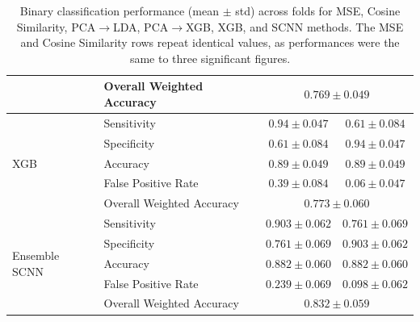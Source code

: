 \begin{table}[htbp]
\begin{tabular}{llcc}
       & Overall Weighted Accuracy & \multicolumn{2}{c}{$0.769\pm0.049$} \\
\midrule
\multirow{5}{*}{XGB} 
       & Sensitivity           & $0.94\pm0.047$      & $0.61\pm0.084$     \\
       & Specificity           & $0.61\pm0.084$      & $0.94\pm0.047$     \\
       & Accuracy              & $0.89\pm0.049$      & $0.89\pm0.049$     \\
       & False Positive Rate   & $0.39\pm0.084$      & $0.06\pm0.047$     \\
       & Overall Weighted Accuracy & \multicolumn{2}{c}{$0.773\pm0.060$} \\
\midrule
\multirow{5}{*}{Ensemble SCNN} 
       & Sensitivity           & $0.903\pm0.062$     & $0.761\pm0.069$    \\
       & Specificity           & $0.761\pm0.069$     & $0.903\pm0.062$    \\
       & Accuracy              & $0.882\pm0.060$     & $0.882\pm0.060$    \\
       & False Positive Rate   & $0.239\pm0.069$     & $0.098\pm0.062$    \\
       & Overall Weighted Accuracy & \multicolumn{2}{c}{$0.832\pm0.059$} \\
\bottomrule
\end{tabular}
\caption{Binary classification performance (mean $\pm$ std) across folds for MSE, Cosine Similarity, PCA$\rightarrow$LDA, PCA$\rightarrow$XGB, XGB, and SCNN methods. The MSE and Cosine Similarity rows repeat identical values, as performances were the same to three significant figures.}
\label{table:binary_results_full}
\end{table}


